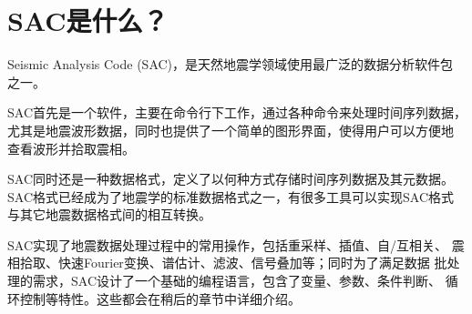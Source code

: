 \section{SAC是什么？}

Seismic Analysis Code (SAC)，是天然地震学领域使用最广泛的数据分析软件包
之一。

SAC首先是一个软件，主要在命令行下工作，通过各种命令来处理时间序列数据，
尤其是地震波形数据，同时也提供了一个简单的图形界面，使得用户可以方便地
查看波形并拾取震相。

SAC同时还是一种数据格式，定义了以何种方式存储时间序列数据及其元数据。
SAC格式已经成为了地震学的标准数据格式之一，有很多工具可以实现SAC格式
与其它地震数据格式间的相互转换。

SAC实现了地震数据处理过程中的常用操作，包括重采样、插值、自/互相关、
震相拾取、快速Fourier变换、谱估计、滤波、信号叠加等；同时为了满足数据
批处理的需求，SAC设计了一个基础的编程语言，包含了变量、参数、条件判断、
循环控制等特性。这些都会在稍后的章节中详细介绍。
